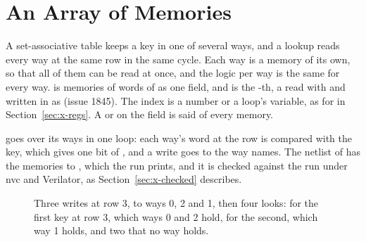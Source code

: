 \section{An Array of Memories}
\label{sec:x-mems}

A set-associative table keeps a key in one of several ways, and a
lookup reads every way at the same row in the same cycle.
Each way is a memory of its own, so that all of them can be read at
once, and the logic per way is the same for every way.
 is  memories of  words of
 as one field, and  is the -th, a
 read with  and written in  as
 (issue 1845).
The index is a number or a loop's variable, as for  in
Section~\ref{sec:x-regs}.
A  or \code{\#[distributed]} on the field is said
of every memory.

 goes over its ways in one loop: each way's word at the
row is compared with the key, which gives one bit of , and
a write goes to the way  names.
The netlist of  has the memories  to
, which the run prints, and it is checked against the run
under nvc and Verilator, as Section~\ref{sec:x-checked} describes.

\begin{figure}[htbp]
\centering

\caption{Three writes at row 3, to ways 0, 2 and 1, then four looks:
for the first key at row 3, which ways 0 and 2 hold, for the second,
which way 1 holds, and two that no way holds.}
\label{fig:x-mems}
\end{figure}




